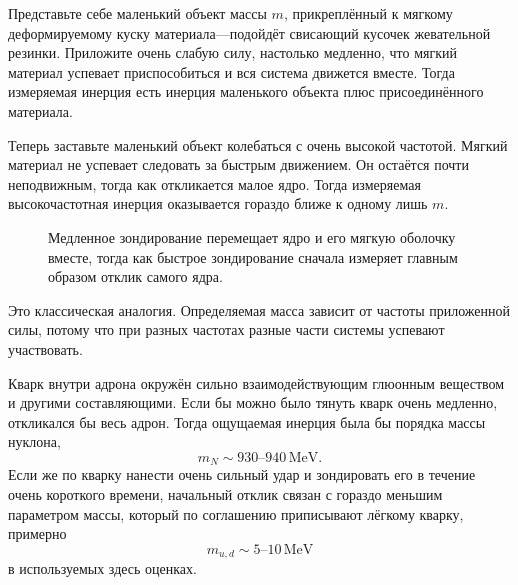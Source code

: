 Представьте себе маленький объект массы \(m\), прикреплённый к мягкому деформируемому куску материала---подойдёт свисающий кусочек жевательной резинки. Приложите очень слабую силу, настолько медленно, что мягкий материал успевает приспособиться и вся система движется вместе. Тогда измеряемая инерция есть инерция маленького объекта плюс присоединённого материала.

Теперь заставьте маленький объект колебаться с очень высокой частотой. Мягкий материал не успевает следовать за быстрым движением. Он остаётся почти неподвижным, тогда как откликается малое ядро. Тогда измеряемая высокочастотная инерция оказывается гораздо ближе к одному лишь \(m\).

\begin{figure}[h]
\centering
{}
\caption{Медленное зондирование перемещает ядро и его мягкую оболочку вместе, тогда как быстрое зондирование сначала измеряет главным образом отклик самого ядра.}
\end{figure}

Это классическая аналогия. Определяемая масса зависит от частоты приложенной силы, потому что при разных частотах разные части системы успевают участвовать.

Кварк внутри адрона окружён сильно взаимодействующим глюонным веществом и другими составляющими. Если бы можно было тянуть кварк очень медленно, откликался бы весь адрон. Тогда ощущаемая инерция была бы порядка массы нуклона,
\begin{equation}
m_N\sim930\text{--}940\,\mathrm{MeV}.
\end{equation}
Если же по кварку нанести очень сильный удар и зондировать его в течение очень короткого времени, начальный отклик связан с гораздо меньшим параметром массы, который по соглашению приписывают лёгкому кварку, примерно
\begin{equation}
m_{u,d}\sim5\text{--}10\,\mathrm{MeV}
\end{equation}
в используемых здесь оценках.

